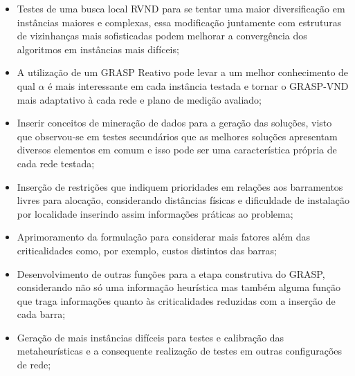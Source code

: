 \documentclass[12pt]{article}
\begin{document}
\begin{itemize}
\item Testes de uma busca local RVND para se tentar uma maior diversificação em instâncias maiores e complexas, essa modificação juntamente com estruturas de vizinhanças mais sofisticadas podem melhorar a convergência dos algoritmos em instâncias mais difíceis;
\item A utilização de um GRASP Reativo pode levar a um melhor conhecimento de qual $\alpha$ é mais interessante em cada instância testada e tornar o GRASP-VND mais adaptativo à cada rede e plano de medição avaliado;
\item Inserir conceitos de mineração de dados para a geração das soluções, visto que observou-se em testes secundários que as melhores soluções apresentam diversos elementos em comum e isso pode ser uma característica própria de cada rede testada;
\item Inserção de restrições que indiquem prioridades em relações aos barramentos livres para alocação, considerando distâncias físicas e dificuldade de instalação por localidade inserindo assim informações práticas ao problema;
\item Aprimoramento da formulação para considerar mais fatores além das criticalidades como, por exemplo, custos distintos das barras;
\item Desenvolvimento de outras funções para a etapa construtiva do GRASP, considerando não só uma informação heurística mas também alguma função que traga informações quanto às criticalidades reduzidas com a inserção de cada barra;
\item Geração de mais instâncias difíceis para testes e calibração das metaheurísticas e a consequente realização de testes em outras configurações de rede;
\end{itemize}
\end{document}
